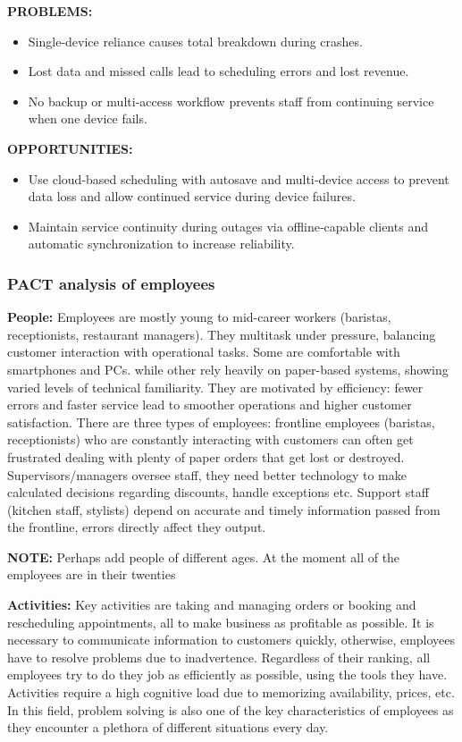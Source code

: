 \documentclass[]{VUMIFTemplateClass}
\newcommand{\noticecomment}[1]{%
    \begin{tcolorbox}[colback=blue!20, colframe=blue!60, arc=0pt, outer arc=0pt, boxrule=1pt, left=3pt, right=3pt, top=3pt, bottom=3pt]
        \textbf{\textcolor{blue!70!black}{NOTE:}} #1
    \end{tcolorbox}
}
\begin{document}
\textbf{PROBLEMS:}
\begin{itemize}
    \item Single‑device reliance causes total breakdown during crashes.
    \item Lost data and missed calls lead to scheduling errors and lost revenue.
    \item No backup or multi‑access workflow prevents staff from continuing service when one device fails.
\end{itemize}

\textbf{OPPORTUNITIES:}
\begin{itemize}
    \item Use cloud‑based scheduling with autosave and multi‑device access to prevent data loss and allow continued service during device failures.
    \item Maintain service continuity during outages via offline‑capable clients and automatic synchronization to increase reliability.
\end{itemize}

\subsubsection{PACT analysis of employees}
    \textbf{People:} Employees are mostly young to mid-career workers (baristas, receptionists, restaurant managers). They multitask under pressure, balancing customer interaction with operational tasks. Some are comfortable with smartphones and PCs. while other rely heavily on paper-based systems, showing varied levels of technical familiarity. They are motivated by efficiency: fewer errors and faster service lead to smoother operations and higher customer satisfaction. There are three types of employees: frontline employees (baristas, receptionists) who are constantly interacting with customers can often get frustrated dealing with plenty of paper orders that get lost or destroyed. Supervisors/managers oversee staff, they need better technology to make calculated decisions regarding discounts, handle exceptions etc. Support staff (kitchen staff, stylists) depend on accurate and timely information passed from the frontline, errors directly affect they output.

    \noticecomment{Perhaps add people of different ages. At the moment all of the employees are in their twenties}
    

    \textbf{Activities:} Key activities are taking and managing orders or 
booking and rescheduling appointments, all to make business as profitable as possible. It is necessary to communicate information to customers quickly, otherwise, employees have
to resolve problems due to inadvertence. Regardless of their ranking, all employees try to do they job as efficiently as possible, using the tools they have. Activities require a high cognitive load due to memorizing availability, prices, etc. In this field, problem solving is also one of the key characteristics of employees as they encounter a plethora of different situations every day.
\end{document}
